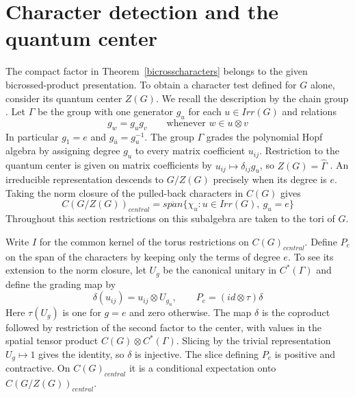 \documentclass[11pt,a4paper]{article}
\theoremstyle{remark}
\begin{document}
\section{Character detection and the quantum center}\label{seccenter}

The compact factor in Theorem~\ref{bicrosscharacters} belongs to the
given bicrossed-product presentation. To obtain a character test defined
for $G$ alone, consider its quantum center $Z(G)$. We recall the
description by the chain group \cite{chirvasitu,kss}. Let $\Gamma$ be
the group with one generator $g_u$ for each $u\in Irr(G)$ and relations
\[
 g_w=g_u g_v \qquad\text{whenever } w\in u\otimes v
\]
In particular $g_1=e$ and $g_{\bar u}=g_u^{-1}$. The group $\Gamma$
grades the polynomial Hopf algebra by assigning degree $g_u$ to every
matrix coefficient $u_{ij}$. Restriction to the quantum center is
given on matrix coefficients by $u_{ij}\mapsto\delta_{ij}g_u$, so
$Z(G)=\widehat\Gamma$ \cite[Remark~2.7]{kss}. An irreducible
representation descends to $G/Z(G)$ precisely when its degree is $e$.
Taking the norm closure of the pulled-back characters in $C(G)$ gives
\[
 C(G/Z(G))_{central}=\overline{span}\{\chi_u:u\in Irr(G),\ g_u=e\}
\]
Throughout this section restrictions on this subalgebra are taken to
the tori of $G$.

Write $I$ for the common kernel of the torus restrictions on $C(G)_{central}$.
Define $P_e$ on the span of the characters by keeping only the terms
of degree $e$. To see its extension to the norm closure, let $U_g$ be
the canonical unitary in $C^*(\Gamma)$ and define the grading map by
\[
 \delta(u_{ij})=u_{ij}\otimes U_{g_u},\qquad
 P_e=(id\otimes\tau)\delta
\]
Here $\tau(U_g)$ is one for $g=e$ and zero otherwise. The map $\delta$
is the coproduct followed by restriction of the second factor to the
center, with values in the spatial tensor product
$C(G)\otimes C^*(\Gamma)$. Slicing by the trivial representation
$U_g\mapsto1$ gives the identity, so $\delta$ is injective. The
slice defining $P_e$ is positive and contractive. On $C(G)_{central}$ it is a
conditional expectation onto $C(G/Z(G))_{central}$.
\end{document}

